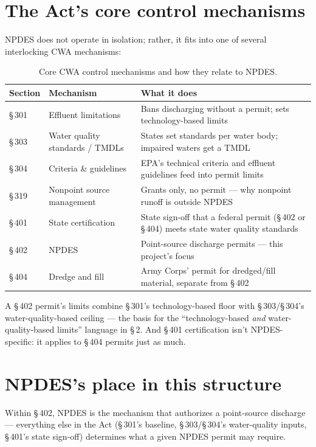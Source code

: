 \documentclass[11pt]{article}
\begin{document}
\section{The Act's core control mechanisms}

NPDES does not operate in isolation; rather, it fits into one of several interlocking
CWA mechanisms:

\begin{table}[h]
\centering
\begin{tabular}{@{}p{}p{}p{}@{}}
\toprule
Section & Mechanism & What it does \\
\midrule
\S\,301 & Effluent limitations & Bans discharging without a permit; sets
  technology-based limits \\
\S\,303 & Water quality standards / TMDLs & States set standards per water body;
  impaired waters get a TMDL \\
\S\,304 & Criteria \& guidelines & EPA's technical criteria and effluent guidelines
  feed into permit limits \\
\S\,319 & Nonpoint source management & Grants only, no permit --- why nonpoint runoff
  is outside NPDES \\
\S\,401 & State certification & State sign-off that a federal permit (\S\,402 or
  \S\,404) meets state water quality standards \\
\S\,402 & NPDES & Point-source discharge permits --- this project's focus \\
\S\,404 & Dredge and fill & Army Corps' permit for dredged/fill material, separate
  from \S\,402 \\
\bottomrule
\end{tabular}
\caption{Core CWA control mechanisms and how they relate to NPDES.}
\end{table}

A \S\,402 permit's limits combine \S\,301's technology-based floor with
\S\,303/\S\,304's water-quality-based ceiling --- the basis for the
``technology-based \textit{and} water-quality-based limits'' language in
 \S\,2. And \S\,401 certification isn't NPDES-specific: it
applies to \S\,404 permits just as much.

\section{NPDES's place in this structure}

Within \S\,402, NPDES is the mechanism that authorizes a point-source discharge ---
everything else in the Act (\S\,301's baseline, \S\,303/\S\,304's water-quality inputs,
\S\,401's state sign-off) determines what a given NPDES permit may require.
\end{document}
